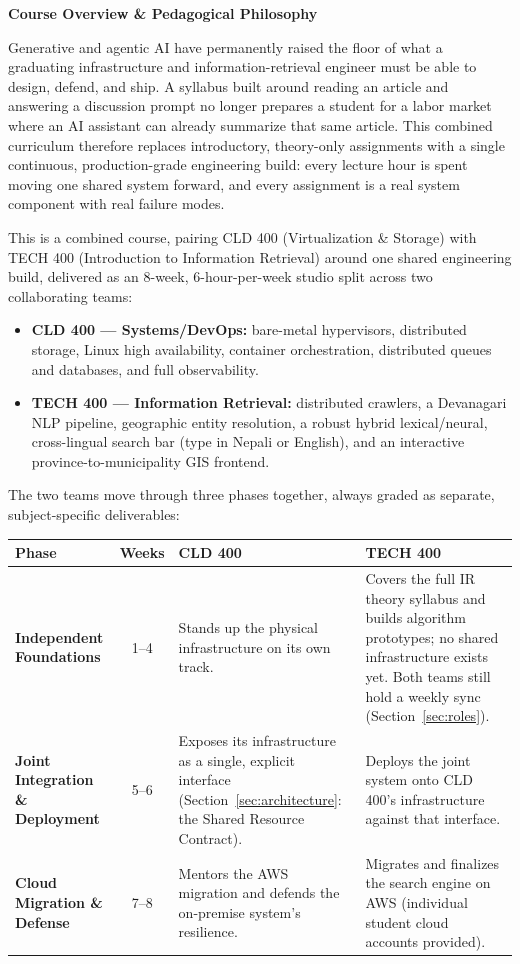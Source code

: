 \documentclass[10pt, a4paper]{article}
\newcommand{\sectionbar}[1]{%
  \par\vspace{0.7em}
  \refstepcounter{section}%
  \noindent\colorbox{secondary}{\parbox{\dimexpr\textwidth-2\fboxsep\relax}{\centering\color{white}\bfseries\Large #1}}%
  \par\vspace{0.5em}
}
\begin{document}
\sectionbar{Course Overview \& Pedagogical Philosophy}

Generative and agentic AI have permanently raised the floor of what a graduating infrastructure and information-retrieval engineer must be able to design, defend, and ship. A syllabus built around reading an article and answering a discussion prompt no longer prepares a student for a labor market where an AI assistant can already summarize that same article. This combined curriculum therefore replaces introductory, theory-only assignments with a single continuous, production-grade engineering build: every lecture hour is spent moving one shared system forward, and every assignment is a real system component with real failure modes.

This is a combined course, pairing CLD 400 (Virtualization \& Storage) with TECH 400 (Introduction to Information Retrieval) around one shared engineering build, delivered as an 8-week, 6-hour-per-week studio split across two collaborating teams:
\begin{itemize}
    \item \textbf{CLD 400 --- Systems/DevOps:} bare-metal hypervisors, distributed storage, Linux high availability, container orchestration, distributed queues and databases, and full observability.
    \item \textbf{TECH 400 --- Information Retrieval:} distributed crawlers, a Devanagari NLP pipeline, geographic entity resolution, a robust hybrid lexical/neural, cross-lingual search bar (type in Nepali or English), and an interactive province-to-municipality GIS frontend.
\end{itemize}
The two teams move through three phases together, always graded as separate, subject-specific deliverables:

\begin{table}[H]
\centering
\small
\renewcommand{\arraystretch}{1.3}
\begin{tabularx}{\textwidth}{|>{\bfseries}l|c|X|X|}
\hline
\rowcolor{lightgray}
Phase & Weeks & CLD 400 & TECH 400 \\ \hline
Independent Foundations & 1--4 & Stands up the physical infrastructure on its own track. & Covers the full IR theory syllabus and builds algorithm prototypes; no shared infrastructure exists yet. Both teams still hold a weekly sync (Section~\ref{sec:roles}). \\ \hline
Joint Integration \& Deployment & 5--6 & Exposes its infrastructure as a single, explicit interface (Section~\ref{sec:architecture}: the Shared Resource Contract). & Deploys the joint system onto CLD 400's infrastructure against that interface. \\ \hline
Cloud Migration \& Defense & 7--8 & Mentors the AWS migration and defends the on-premise system's resilience. & Migrates and finalizes the search engine on AWS (individual student cloud accounts provided). \\ \hline
\end{tabularx}
\end{table}
\end{document}

